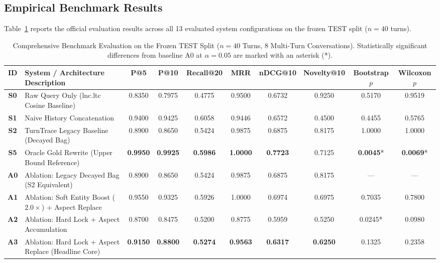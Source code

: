\documentclass[10pt,a4paper,twocolumn]{article}
\begin{document}
\subsection{Empirical Benchmark Results}
Table~\ref{tab:benchmark_results} reports the official evaluation results across all 13 evaluated system configurations on the frozen TEST split ($n=40$ turns).

\begin{table}[t]
\centering
\scriptsize
\caption{Comprehensive Benchmark Evaluation on the Frozen TEST Split ($n=40$ Turns, 8 Multi-Turn Conversations). Statistically significant differences from baseline A0 at $\alpha = 0.05$ are marked with an asterisk (*).}
\label{tab:benchmark_results}
\begin{tabularx}{\textwidth}{c p{4.8cm} c c c c c c c c}
\toprule
\textbf{ID} & \textbf{System / Architecture Description} & \textbf{P@5} & \textbf{P@10} & \textbf{Recall@20} & \textbf{MRR} & \textbf{nDCG@10} & \textbf{Novelty@10} & \textbf{Bootstrap $p$} & \textbf{Wilcoxon $p$} \\
\midrule
\textbf{S0} & Raw Query Only ($\text{lnc.ltc}$ Cosine Baseline) & 0.8350 & 0.7975 & 0.4775 & 0.9500 & 0.6732 & 0.9250 & 0.5170 & 0.9519 \\
\textbf{S1} & Naive History Concatenation & 0.9400 & 0.9425 & 0.6058 & 0.9446 & 0.6572 & 0.4500 & 0.4455 & 0.5765 \\
\textbf{S2} & TurnTrace Legacy Baseline (Decayed Bag) & 0.8900 & 0.8650 & 0.5424 & 0.9875 & 0.6875 & 0.8175 & 1.0000 & 1.0000 \\
\textbf{S5} & Oracle Gold Rewrite (Upper Bound Reference) & \textbf{0.9950} & \textbf{0.9925} & \textbf{0.5986} & \textbf{1.0000} & \textbf{0.7723} & 0.7125 & \textbf{0.0045}* & \textbf{0.0069}* \\
\midrule
\textbf{A0} & Ablation: Legacy Decayed Bag (S2 Equivalent) & 0.8900 & 0.8650 & 0.5424 & 0.9875 & 0.6875 & 0.8175 & --- & --- \\
\textbf{A1} & Ablation: Soft Entity Boost ($2.0\times$) + Aspect Replace & 0.9550 & 0.9325 & 0.5926 & 1.0000 & 0.6974 & 0.6975 & 0.7035 & 0.7800 \\
\textbf{A2} & Ablation: Hard Lock + Aspect Accumulation & 0.8700 & 0.8475 & 0.5200 & 0.8775 & 0.5959 & 0.5250 & 0.0245* & 0.0980 \\
\textbf{A3} & Ablation: Hard Lock + Aspect Replace (Headline Core) & \textbf{0.9150} & \textbf{0.8800} & \textbf{0.5274} & \textbf{0.9563} & \textbf{0.6317} & \textbf{0.6250} & 0.1325 & 0.2358 \\

\end{tabularx}
\end{table}
\end{document}
